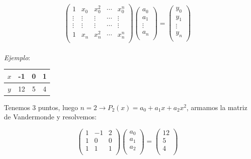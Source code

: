 $$
    \begin{pmatrix}
        1 & x_{0} & x_{0}^{2} & \cdots & x_{0}^{n}\\
        \vdots & \vdots & \vdots & \cdots & \vdots\\
        \vdots & \vdots & \vdots & \cdots & \vdots\\
        1 & x_{n} & x_{n}^{2} & \cdots & x_{n}^{n}\\
    \end{pmatrix}
    \begin{pmatrix}
        a_{0}\\
        a_{1}\\
        \vdots\\
        a_{n}\\
    \end{pmatrix}
    =
    \begin{pmatrix}
        y_{0}\\
        y_{1}\\
        \vdots\\
        y_{n}\\
    \end{pmatrix}
$$\\

\textit{Ejemplo}:

\begin{table}[h]
    \centering
    \begin{tabular}{|c|c|c|c|}
        \hline
        $x$ & -1 & 0 & 1\\ \hline
        $y$ & 12 & 5 & 4\\ \hline
    \end{tabular}
\end{table}

Tenemos 3 puntos, luego $n = 2 \rightarrow P_{2}(x) = a_{0} + a_{1}x + a_{2}x^{2}$, armamos la matriz de Vandermonde y resolvemos:

$$
    \begin{pmatrix}
        1 & -1 & 2\\
        1 & 0 & 0\\
        1 & 1 & 1\\
    \end{pmatrix}
    \begin{pmatrix}
        a_{0}\\
        a_{1}\\
        a_{2}\\
    \end{pmatrix}
    =
    \begin{pmatrix}
        12\\
        5\\
        4\\
    \end{pmatrix}
$$\\

